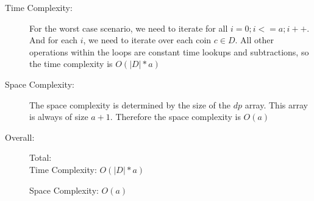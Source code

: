 \begin{description}
    \item[Time Complexity:]
        For the worst case scenario, we need to iterate for all $i = 0; i <= a; i++$.
        And for each $i$, we need to iterate over each coin $c \in D$.
        All other operations within the loops are constant time lookups and subtractions, so the time complexity is $O(|D| * a)$
            
    \item[Space Complexity:] 
        The space complexity is determined by the size of the $dp$ array. This array is always of size $a+1$.
        Therefore the space complexity is $O(a)$
        
    \item[Overall:] Total:\\
        Time Complexity: $O(|D| * a)$

        Space Complexity: $O(a)$
        
\end{description}